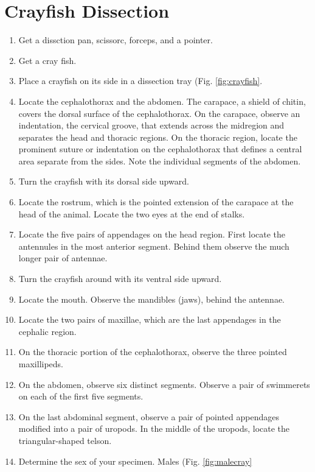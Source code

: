 \section{Crayfish Dissection}\label{crayfish-dissection}

\begin{enumerate}
\def\labelenumi{\arabic{enumi}.}
\tightlist
\item
  Get a dissction pan, scissorc, forceps, and a pointer.
\item
  Get a cray fish.
\item
  Place a crayfish on its side in a dissection tray (Fig.
  \ref{fig:crayfish}.
\item
  Locate the cephalothorax and the abdomen. The carapace, a shield of
  chitin, covers the dorsal surface of the cephalothorax. On the
  carapace, observe an indentation, the cervical groove, that extends
  across the midregion and separates the head and thoracic regions. On
  the thoracic region, locate the prominent suture or indentation on the
  cephalothorax that defines a central area separate from the sides.
  Note the individual segments of the abdomen.
\item
  Turn the crayfish with its dorsal side upward.
\item
  Locate the rostrum, which is the pointed extension of the carapace at
  the head of the animal. Locate the two eyes at the end of stalks.
\item
  Locate the five pairs of appendages on the head region. First locate
  the antennules in the most anterior segment. Behind them observe the
  much longer pair of antennae.
\item
  Turn the crayfish around with its ventral side upward.
\item
  Locate the mouth. Observe the mandibles (jaws), behind the antennae.
\item
  Locate the two pairs of maxillae, which are the last appendages in the
  cephalic region.
\item
  On the thoracic portion of the cephalothorax, observe the three
  pointed maxillipeds.
\item
  On the abdomen, observe six distinct segments. Observe a pair of
  swimmerets on each of the first five segments.
\item
  On the last abdominal segment, observe a pair of pointed appendages
  modified into a pair of uropods. In the middle of the uropods, locate
  the triangular-shaped telson.
\item
  Determine the sex of your specimen. Males (Fig. \ref{fig:malecray}

\end{enumerate}

